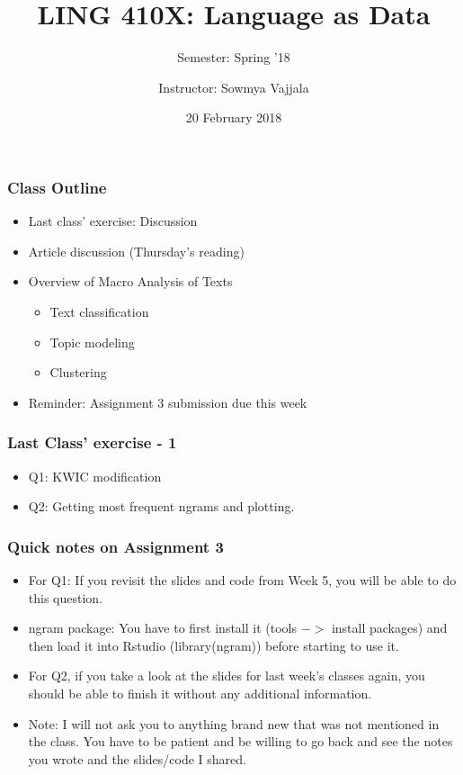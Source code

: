 \documentclass{beamer}
\author[Sowmya Vajjala]{Instructor: Sowmya Vajjala}
\title[LING 410X]{LING 410X: Language as Data}
\subtitle{Semester: Spring '18}
\date{20 February 2018}
\institute{Iowa State University, USA}
\begin{document}
\begin{frame}\titlepage
\end{frame}

\begin{frame}
\frametitle{Class Outline}
\begin{itemize}
\item Last class' exercise: Discussion
\item Article discussion (Thursday's reading)
\item Overview of Macro Analysis of Texts
\begin{itemize}
\item Text classification
\item Topic modeling
\item Clustering
\end{itemize}
\item Reminder: Assignment 3 submission due this week
\end{itemize}
\end{frame}

\begin{frame}
\frametitle{Last Class' exercise - 1}
\begin{itemize}
\item Q1: KWIC modification
\item Q2: Getting most frequent ngrams and plotting. 
\end{itemize}
\end{frame}

\begin{frame}
\frametitle{Quick notes on Assignment 3}
\begin{itemize}
\item For Q1: If you revisit the slides and code from Week 5, you will be able to do this question.
\item ngram package: You have to first install it (tools $->$ install packages) and then load it into Rstudio (library(ngram)) before starting to use it. 
\item For Q2, if you take a look at the slides for last week's classes again, you should be able to finish it without any additional information. 
\item Note: I will not ask you to anything brand new that was not mentioned in the class. You have to be patient and be willing to go back and see the notes you wrote and the slides/code I shared. 
\end{itemize}
\end{frame}
\end{document}
